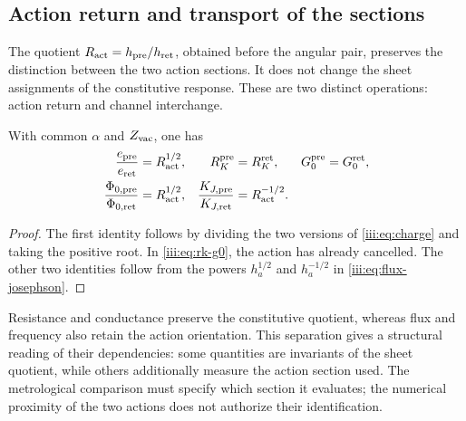\subsection{Action return and transport of the sections}

The quotient $R_{\rm act}=h_{\rm pre}/h_{\rm ret}$, obtained before the
angular pair, preserves the distinction between the two action sections.
It does not change the sheet assignments of the constitutive response. These are
two distinct operations: action return and channel interchange.

\begin{proposition}
With common $\alpha$ and $Z_{\rm vac}$, one has
\begin{align}
 \frac{e_{\rm pre}}{e_{\rm ret}}&=R_{\rm act}^{1/2},
 &R_K^{\rm pre}&=R_K^{\rm ret},
 &G_0^{\rm pre}&=G_0^{\rm ret},\label{iii:eq:charge-return}\\
 \frac{\Phi_{0,\rm pre}}{\Phi_{0,\rm ret}}&=R_{\rm act}^{1/2},
 &\frac{K_{J,\rm pre}}{K_{J,\rm ret}}&=R_{\rm act}^{-1/2}.
 \label{iii:eq:flux-return}
\end{align}
\end{proposition}
\begin{proof}
The first identity follows by dividing the two versions of
\eqref{iii:eq:charge} and taking the positive root. In
\eqref{iii:eq:rk-g0}, the action has already cancelled. The other two
identities follow from the powers $h_a^{1/2}$ and $h_a^{-1/2}$ in
\eqref{iii:eq:flux-josephson}.
\end{proof}

Resistance and conductance preserve the constitutive quotient, whereas
flux and frequency also retain the action orientation. This
separation gives a structural reading of their dependencies: some quantities
are invariants of the sheet quotient, while others additionally measure the
action section used. The metrological comparison must specify which section it evaluates;
the numerical proximity of the two actions does not authorize their identification.

